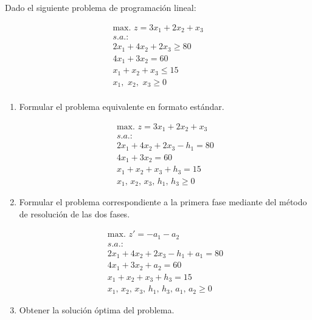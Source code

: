 Dado el siguiente problema de programación lineal:

\begin{equation}
\begin{split}
\mbox{max. } z = 3x_1 + 2x_2 + x_3\\
s.a.:\\
2x_1 + 4x_2 + 2x_3 \geq 80\\
4x_1 + 3x_2 = 60\\
 x_1 +  x_2 +  x_3 \leq 15\\
x_1,\,\,x_2,\,\,x_3\geq 0\\
\end{split}
\end{equation}

\begin{enumerate}
    \item Formular el problema equivalente en formato estándar.


    \begin{equation}
\begin{split}
\mbox{max. } z = 3x_1 + 2x_2 + x_3\\
s.a.:\\
2x_1+4x_2+2x_3-h_1 = 80\\
4x_1+3x_2 = 60\\
x_1+x_2+x_3+h_3 = 15\\
x_1,\,x_2,\,x_3,\,h_1,\,h_3\geq 0
\end{split}
\end{equation}

    \item Formular el problema correspondiente a la primera fase mediante del método de resolución de las dos fases.

\begin{equation}
\begin{split}
\mbox{max. } z' = -a_1-a_2\\
s.a.:\\
2x_1+4x_2+2x_3-h_1+a_1 = 80\\
4x_1+3x_2+a_2 = 60\\
x_1+x_2+x_3+h_3 = 15\\
x_1,\,x_2,\,x_3,\,h_1,\,h_3,\,a_1,\,a_2\geq 0
\end{split}
\end{equation}


\item Obtener la solución óptima del problema.


\end{enumerate}
